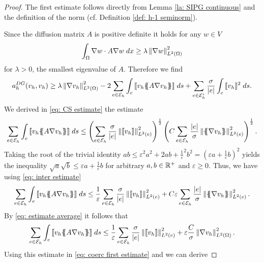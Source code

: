\begin{proof}
	The first estimate follows directly from Lemma \ref{la: SIPG continuous} and the definition of the norm (cf. Definition \ref{def: h-1 seminorm}). 
		
	Since the diffusion matrix $A$ is positive definite it holds for any $w \in V$
	\begin{align}
	\int_{\Omega} {{\nabla w \cdot A \nabla w}\;dx} \geq \lambda \left\lVert \nabla w  \right\rVert_{L^2(\Omega)}^2  \label{eq: estimate pos def}
	\end{align}
	for $\lambda >0$, the smallest eigenvalue of $A$.
	Therefore we find
	\begin{align}
	a_h^{DG}(v_h,v_h) \geq \lambda \left\lVert \nabla v_h \right\rVert_{L^2(\Omega)}^2 - 2 \sum\limits_{e \in \mathcal{E}_h}\int_{e} {{ \llbracket v_h \{\!\!\{ A \nabla v_h \}\!\!\}  \rrbracket}\;ds} + \sum_{e\in \mathcal{E}_h^i} \frac \sigma {|e|} \int_{e} {{\llbracket v_h \rrbracket^2}\;ds} .\label{eq: coerc first estimate}
	\end{align}
	We derived in \eqref{eq: CS estimate} the estimate 
	\begin{align}
	\sum\limits_{e \in \edges}\myIntS e { \jump {v_h \average{A \nabla v_h} }}
	\leq		\left( \sum\limits_{e \in \edges} \frac {\sigma}{|e|} \LTwonormE{\jump {v_h}}^2 \right)^{\frac 1 2}
	\left(C \sum\limits_{e \in \edges} \frac {|e|} \sigma \LTwonormE{\average{\nabla v_h}}^2 \right)^{\frac 1 2}. \label{eq: inter estimate}
	\end{align}
	Taking the root of the trivial identity $ab \leq \varepsilon^2 a^2 + 2ab + {\frac 1 \varepsilon}^2b^2 = \left( \varepsilon a + \frac 1 \varepsilon b\right)^2$ yields the inequality $\sqrt{a} \sqrt{b} \leq \varepsilon a + \frac 1 \varepsilon b$ for arbitrary $a,b \in \mathbb{R}^+$ and $\varepsilon \geq 0$. Thus, we have using \eqref{eq: inter estimate}
	\begin{align*}
	\sum\limits_{e \in \edges}\myIntS e { \jump {v_h \average{A \nabla v_h} }} 
	\leq \frac 1 \varepsilon \sum\limits_{e \in \edges}\frac \sigma {|e|}\LTwonormE{\jump {v_h}}^2 
	+ C\varepsilon  \sum\limits_{e \in \edges}  \frac {|e|} \sigma \LTwonormE{\average{\nabla v_h}}^2.
	\end{align*}
	By \eqref{eq: estimate average} it follows that 
	\begin{align*}
		\sum\limits_{e \in \mathcal{E}_h}\int_{e} {{ \llbracket v_h \{\!\!\{ A \nabla v_h \}\!\!\}  \rrbracket}\;ds} 
		\leq \frac 1 \varepsilon \sum\limits_{e \in \mathcal{E}_h}\frac \sigma {|e|}\left\lVert \llbracket v_h \rrbracket \right\rVert_{L^2(e)}^2 
		+ \varepsilon  \frac C \sigma \left\lVert \nabla v_h \right\rVert_{L^2(\Omega)}^2.
	\end{align*}			
	Using this estimate in \eqref{eq: coerc first estimate} and we can derive

\end{proof}
